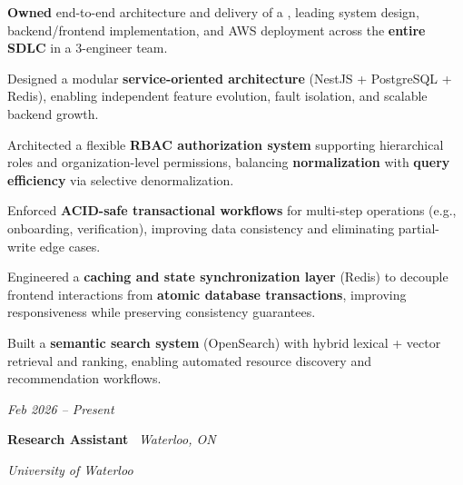     \vspace{0.10 cm}
    \begin{onecolentry}
        \begin{highlights}
    
    \item \textbf{Owned} end-to-end architecture and delivery of a , leading system design, backend/frontend implementation, and AWS deployment across the \textbf{entire SDLC} in a 3-engineer team.

    \item Designed a modular \textbf{service-oriented architecture} (NestJS + PostgreSQL + Redis), enabling independent feature evolution, fault isolation, and scalable backend growth.

    \item Architected a flexible \textbf{RBAC authorization system} supporting hierarchical roles and organization-level permissions, balancing \textbf{normalization} with \textbf{query efficiency} via selective denormalization.

    \item Enforced \textbf{ACID-safe transactional workflows} for multi-step operations (e.g., onboarding, verification), improving data consistency and eliminating partial-write edge cases.

    \item Engineered a \textbf{caching and state synchronization layer} (Redis) to decouple frontend interactions from \textbf{atomic database transactions}, improving responsiveness while preserving consistency guarantees.

    \item Built a \textbf{semantic search system} (OpenSearch) with hybrid lexical + vector retrieval and ranking, enabling automated resource discovery and recommendation workflows.

        
        \end{highlights}
    \end{onecolentry}
\vspace{0.2cm}    \begin{twocolentry}{

    \textit{Feb 2026 -- Present}}
        \textbf{Research Assistant} \textbar\ \textit{Waterloo, ON}
        
        \textit{University of Waterloo}
    \end{twocolentry}

